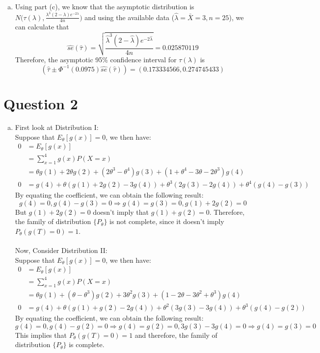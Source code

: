 \documentclass[a4paper,11pt]{article}
\begin{document}
\begin{enumerate}[(a)]
	\item
		Using part (c), we know that the asymptotic distribution is $N\bigg(\tau(\lambda), \frac{\lambda^3(2-\lambda)e^{-2\lambda} }{4n} \bigg)$ and using the available data ($\hat{\lambda}=\bar{X} = 3 , n=25$), we can calculate that
		\[
		\hat{se}(\hat{\tau}) = \sqrt{ \frac{\hat{\lambda}^3(2-\hat{\lambda})e^{-2\hat{\lambda}} }{4n}} = 0.025870119
		\]
		Therefore, the asymptotic 95\% confidence interval for $\tau(\lambda)$ is 
		\[
		(\hat{\tau} \pm \Phi^{-1}(0.0975)\hat{se}(\hat{\tau})) =(0.173334566,0.274745433)
		\]
\end{enumerate}
\newpage
\section{Question 2}
\begin{enumerate}[(a)]
	\item
	First look at Distribution I:
	\\Suppose  that $E_{\theta}[g(x)] = 0$, we then have:
	\begin{align*}
	0 &= E_{\theta}[g(x)] \\
	&=\sum^4_{x=1} g(x) P(X=x)\\
	&= \theta g(1) +2\theta g(2) + (2\theta^3 -\theta^4) g(3) + (1+\theta^4-3\theta-2\theta^3) g(4)\\
	0 &= g(4)+ \theta(g(1)+2g(2)-3g(4))+\theta^3(2g(3)-2g(4))+\theta^4(g(4)-g(3))
	\end{align*}
	By equating the coefficient, we can obtain the following result:
	\[
	g(4) = 0, g(4)-g(3)=0 \Rightarrow g(4) = g(3) = 0 , g(1)+2g(2) = 0
	\]
	But $ g(1)+2g(2) = 0$ doesn't imply that $g(1)+ g(2) = 0 $. Therefore, the family of distribution $\{P_{\theta}\}$ is not complete, since it doesn't imply $P_{\theta}(g(T)=0)=1$. 
	\\ \\Now, Consider Distribution II:
	\\Suppose  that $E_{\theta}[g(x)] = 0$, we then have:
	\begin{align*}
	0 &= E_{\theta}[g(x)] \\
	&=\sum^4_{x=1} g(x) P(X=x)\\
	&= \theta g(1) +(\theta-\theta^3) g(2) + 3\theta^2g(3) + (1-2\theta-3\theta^2+\theta^3) g(4)\\
	0 &= g(4)+ \theta(g(1)+g(2)-2g(4))+\theta^2(3g(3)-3g(4))+\theta^3(g(4)-g(2))
	\end{align*}
	By equating the coefficient, we can obtain the following result:
	\[
	g(4) = 0, g(4)-g(2)=0 \Rightarrow g(4) = g(2) = 0 , 3g(3)-3g(4) = 0\Rightarrow g(4) = g(3) = 0 
	\]
	This implies that $P_{\theta}(g(T)=0)=1$ and therefore, the family of distribution $\{P_{\theta}\}$ is complete.
\end{enumerate}
\newpage
\end{document}
